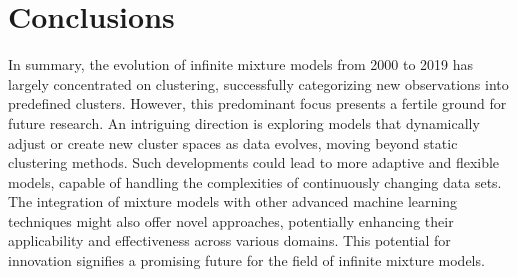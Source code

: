 \documentclass{article}
\begin{document}
\section{Conclusions}

In summary, the evolution of infinite mixture models from 2000 to 2019 has largely concentrated on clustering, successfully categorizing new observations into predefined clusters. However, this predominant focus presents a fertile ground for future research. An intriguing direction is exploring models that dynamically adjust or create new cluster spaces as data evolves, moving beyond static clustering methods. Such developments could lead to more adaptive and flexible models, capable of handling the complexities of continuously changing data sets. The integration of mixture models with other advanced machine learning techniques might also offer novel approaches, potentially enhancing their applicability and effectiveness across various domains. This potential for innovation signifies a promising future for the field of infinite mixture models.

\end{document}
